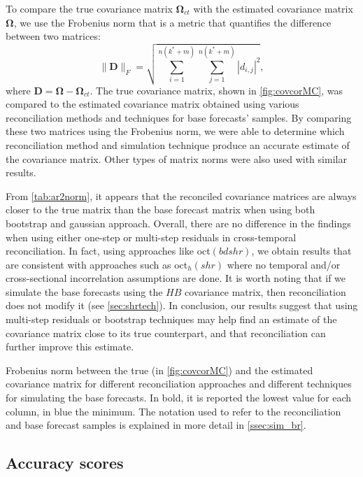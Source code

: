 \documentclass[a4paper,11pt]{article}
\newcommand{\Dvet}{\bm{D}}
\newcommand{\Omegavet}{\bm{\Omega}}
\theoremstyle{definition}
\begin{document}
To compare the true covariance matrix $\Omegavet_{ct}$ with the estimated covariance matrix $\Omegavet$, we use the Frobenius norm that is a metric that quantifies the difference between two matrices:
$$
	\lVert \Dvet \rVert_F = \sqrt{\sum_{i = 1}^{n(k^\ast + m)}\sum_{j = 1}^{n(k^\ast + m)}|d_{i,j}|^2},
$$
where $\Dvet = \Omegavet - \Omegavet_{ct}$. The true covariance matrix, shown in \autoref{fig:covcorMC}, was compared to the estimated covariance matrix obtained using various reconciliation methods and techniques for base forecasts' samples. By comparing these two matrices using the Frobenius norm, we were able to determine which reconciliation method and simulation technique produce an accurate estimate of the covariance matrix. Other types of matrix norms were also used with similar results.

From \autoref{tab:ar2norm}, it appears that the reconciled covariance matrices are always closer to the true matrix than the base forecast matrix when using both bootstrap and gaussian approach. Overall, there are no difference in the findings when using either one-step or multi-step residuals in cross-temporal reconciliation. In fact, using approaches like oct$(bdshr)$, we obtain results that are consistent with approaches such as oct$_h(shr)$ where no temporal and/or cross-sectional incorrelation assumptions are done. It is worth noting that if we simulate the base forecasts using the $HB$ covariance matrix, then reconciliation does not modify it (see \autoref{sec:shrtech}). In conclusion, our results suggest that using multi-step residuals or bootstrap techniques may help find an estimate of the covariance matrix close to its true counterpart, and that reconciliation can further improve this estimate.

\begin{table}[t]
	\centering
	\begingroup
	\fontsize{9}{11}\selectfont
	
	\endgroup
	\caption{Frobenius norm between the true (in \autoref{fig:covcorMC}) and the estimated covariance matrix for different reconciliation approaches and different techniques for simulating the base forecasts. In bold, it is reported the lowest value for each column, in blue the minimum.  The notation used to refer to the reconciliation and base forecast samples is explained in more detail in \autoref{ssec:sim_br}.}
	\label{tab:ar2norm}
\end{table}

\subsection{Accuracy scores}\label{ssec:acc_scores}
\end{document}
